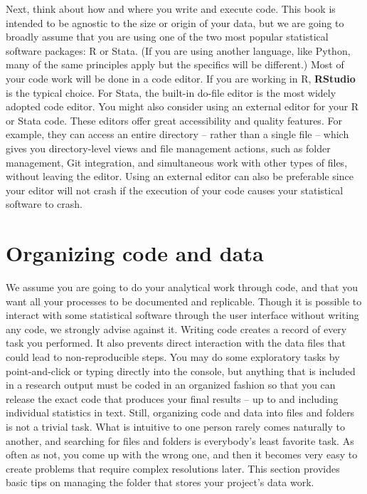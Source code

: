Next, think about how and where you write and execute code.
This book is intended to be agnostic to the size or origin of your data,
but we are going to broadly assume that you are using
one of the two most popular statistical software packages: R or Stata.
(If you are using another language, like Python,
many of the same principles apply but the specifics will be different.)
Most of your code work will be done in a code editor.
If you are working in R, \textbf{RStudio} is the typical choice.
For Stata, the built-in do-file editor is the most widely adopted code editor.
You might also consider using an external editor for your R or Stata code.
These editors offer great accessibility and quality features.
For example, they can access an entire directory -- rather than a single file --
which gives you directory-level views and file management actions,
such as folder management, Git integration,
and simultaneous work with other types of files, without leaving the editor.
Using an external editor can also be preferable since your editor will not crash
if the execution of your code causes your statistical software to crash.

\section{Organizing code and data}

We assume you are going to do your analytical work through code,
and that you want all your processes to be documented and replicable.
Though it is possible to interact with some statistical software
through the user interface without writing any code,
we strongly advise against it.
Writing code creates a record of every task you performed.
It also prevents direct interaction with the data files that could lead to non-reproducible steps.
You may do some exploratory tasks by point-and-click or typing directly into the console,
but anything that is included in a research output
must be coded in an organized fashion so that you can release
the exact code that produces your final results --
up to and including individual statistics in text.
Still, organizing code and data into files and folders is not a trivial task.
What is intuitive to one person rarely comes naturally to another,
and searching for files and folders is everybody's least favorite task.
As often as not, you come up with the wrong one,
and then it becomes very easy to create problems that require complex resolutions later.
This section provides basic tips on managing the folder
that stores your project's data work.

